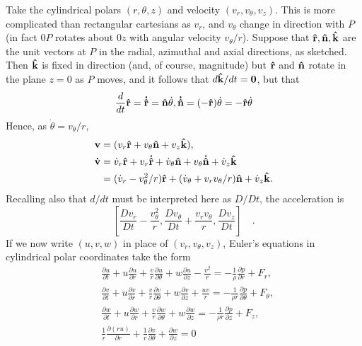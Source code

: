 \documentclass[twoside,a4paper,11pt]{report}
\begin{document}
Take the cylindrical polars $(r,\theta,z)$ and velocity 
$(v_r ,v_\theta ,v_z )$. This is more complicated than rectangular 
cartesians as $v_{r}$, and $v_{\theta }$ change in direction with $P$ (in fact 
$0P$ rotates about $0z$ with angular velocity $v_{\theta }/r$). Suppose that 
${\bf \hat {r}}, {\bf \hat {n}}, {\bf \hat {k}}$ are 
the unit vectors at $P$ in the radial, azimuthal and axial directions, as 
sketched. Then ${\bf \hat {k}}$ is fixed in direction (and, of course, 
magnitude) but ${\bf \hat {r}}$ and ${\bf \hat {n}}$ rotate in 
the plane $z = 0$ as $P$ moves, and it follows that $d{\bf \hat {k}}/dt = 
\textbf{0}$, but that
\[
\frac{d}{dt}{{\bf \hat {r}}}={{\bf \dot {\hat 
{r}}}}={{\bf \hat {n}}}\dot {\theta }, {{\bf \dot 
{\hat {n}}}}=(-{{\bf \hat {r}}})\dot {\theta 
}=-{{\bf \hat {r}}}\dot {\theta }
\]
Hence, as $\dot {\theta }=v_\theta /r$,
\begin{align*}
& {{\bf v}}=(v_r {{\bf \hat {r}}}+v_\theta {{\bf 
\hat {n}}}+v_z {{\bf \hat {k}}}), \\
& {{\bf \dot {v}}}=\dot {v}_r {{\bf \hat {r}}}+v_r 
{{\bf \dot {\hat {r}}}}+\dot {v}_\theta {{\bf \hat 
{n}}}+v_\theta {{\bf \dot {\hat {n}}}}+\dot {v}_z {\rm 
{\bf \hat {k}}} \\
& \phantom{{{\bf \dot {v}}}} =(\dot {v}_r -v_\theta ^2 /r){{\bf \hat 
{r}}}+(\dot {v}_\theta +v_r v_\theta /r){{\bf \hat 
{n}}}+\dot {v}_z {{\bf \hat {k}}}.
\end{align*}
Recalling also that $d/dt$ must be interpreted here as $D/Dt$, the acceleration 
is
\[
\left[ {\frac{Dv_r }{Dt}-\frac{v_\theta ^2 }{r},\frac{Dv_\theta 
}{Dt}+\frac{v_r v_\theta }{r},\frac{Dv_z }{Dt}} \right]\quad .
\]
If we now write $(u,v,w)$ in place of $(v_{r} ,v_{\theta } ,v_{z} )$, 
Euler's equations in cylindrical polar coordinates take the form
\begin{align*}
&
\frac{\partial u}{\partial t}+u\frac{\partial u}{\partial 
r}+\frac{v}{r}\frac{\partial u}{\partial \theta 
}+w\frac{\partial u}{\partial 
z}-\frac{v^2}{r}=-\frac{1}{\rho }\frac{\partial 
p}{\partial r}+F_r ,
\\
&
\frac{\partial v}{\partial t}+u\frac{\partial v}{\partial 
r}+\frac{v}{r}\frac{\partial v}{\partial \theta 
}+w\frac{\partial v}{\partial z 
}+\frac{uv}{r}=-\frac{1}{\rho r}\frac{\partial 
p}{\partial \theta }+F_\theta ,
\\
&
\frac{\partial w}{\partial t}+u\frac{\partial w}{\partial 
r}+\frac{v}{r}\frac{\partial w}{\partial \theta 
}+w\frac{\partial w}{\partial z}=-\frac{1}{\rho 
r}\frac{\partial p}{\partial z}+F_z , \\
& \frac{1}{r}\frac{\partial \left( {ru} \right)}{\partial 
r}+\frac{1}{r}\frac{\partial v}{\partial \theta 
}+\frac{\partial w}{\partial z}=0
\\
\end{align*}
\end{document}

